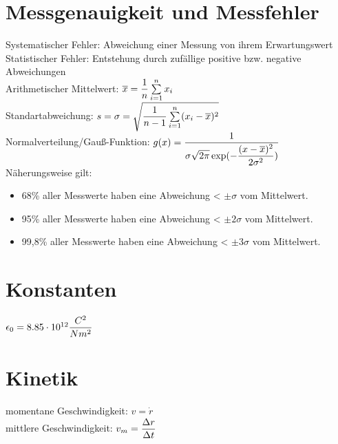 \documentclass[fs, footer]{latex4ei}
\begin{document}
\vspace{-4mm}
\begin{multicols*}{4}


\section{Messgenauigkeit und Messfehler}
Systematischer Fehler: Abweichung einer Messung von ihrem Erwartungswert\\
Statistischer Fehler: Entstehung durch zufällige positive bzw. negative Abweichungen\\
Arithmetischer Mittelwert: $\ol x = \fr{1}{n}\sum_{i=1}^n x_i$\\
Standartabweichung: $s = \sigma = \sqrt{\fr{1}{n-1}\sum_{i=1}^n (x_i-\ol x)^2}$\\
Normalverteilung/Gauß-Funktion: $g(x) = \dfrac{1}{\sigma \sqrt{2\pi}\exp(-\dfrac{(x-\overline{x})^2}{2\sigma^2})}$\\
Näherungsweise gilt: 
\begin{itemize}
\item 68\% aller Messwerte haben eine Abweichung < $\pm \sigma$ vom Mittelwert.
\item 95\% aller Messwerte haben eine Abweichung < $\pm 2\sigma$ vom Mittelwert.
\item 99,8\% aller Messwerte haben eine Abweichung < $\pm 3\sigma$ vom Mittelwert.
\end{itemize}

\section{Konstanten}
$ \epsilon_0 = 8.85\cdot 10^{12} \dfrac{C^2}{Nm^2}$\\

\section{Kinetik}
momentane Geschwindigkeit: $v = \dot r$\\
mittlere Geschwindigkeit: $v_m = \dfrac{\Delta r}{\Delta t}$\\

\end{multicols*}
\end{document}
